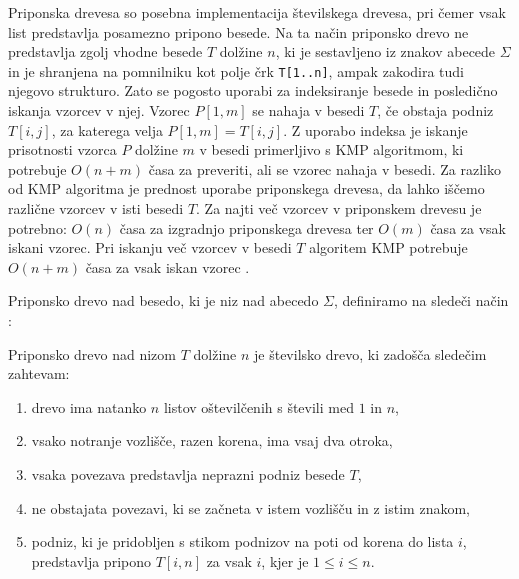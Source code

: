 Priponska drevesa so posebna implementacija številskega drevesa, pri čemer vsak list predstavlja posamezno pripono besede. Na ta način priponsko drevo ne predstavlja zgolj vhodne besede $T$ dolžine $n$, ki je sestavljeno iz znakov abecede $\Sigma$ in je shranjena na pomnilniku kot polje črk \texttt{T[1..n]}, ampak zakodira tudi njegovo strukturo. Zato se pogosto uporabi za indeksiranje besede in posledično iskanja vzorcev v njej. Vzorec $P[1,m]$ se nahaja v besedi $T$, če obstaja podniz $T[i,j]$, za katerega velja $P[1,m]=T[i,j]$. Z uporabo indeksa je iskanje prisotnosti vzorca $P$ dolžine $m$ v besedi primerljivo s KMP algoritmom, ki potrebuje $O(n+m)$ časa za preveriti, ali se vzorec nahaja v besedi. Za razliko od KMP algoritma je prednost uporabe priponskega drevesa, da lahko iščemo različne vzorcev v isti besedi $T$. Za najti več vzorcev v priponskem drevesu je potrebno: $O(n)$ časa za izgradnjo priponskega drevesa ter $O(m)$ časa za vsak iskani vzorec. Pri iskanju več vzorcev v besedi $T$ algoritem KMP potrebuje $O(n+m)$ časa za vsak iskan vzorec \cite{Gusfield1997,KMP}.


%
Priponsko drevo nad besedo, ki je niz nad abecedo $\Sigma$, definiramo na sledeči način \cite{Gusfield1997}:

\begin{defi}\label{def:priposkoDrevo}
    Priponsko drevo nad nizom $T$ dolžine $n$ je številsko drevo, ki zadošča sledečim zahtevam:
    \begin{enumerate}
        \item drevo ima natanko $n$ listov oštevilčenih s števili med $1$ in $n$,
        \item vsako notranje vozlišče, razen korena, ima vsaj dva otroka,
        \item vsaka povezava predstavlja neprazni podniz besede $T$,
        \item ne obstajata %
        povezavi, ki se začneta v istem vozlišču in z istim znakom,
        \item podniz, ki je pridobljen s stikom podnizov na poti od korena do lista $i$, predstavlja pripono $T[i,n]$ za vsak $i$, kjer je $1 \le i\le n$.        
    \end{enumerate}
\end{defi}





